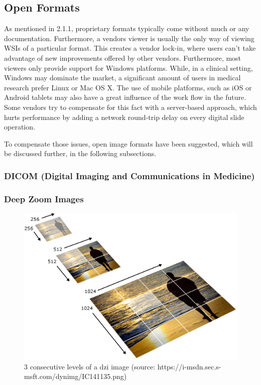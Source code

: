 \subsection{Open Formats}
As mentioned in 2.1.1, proprietary formats typically come without much or any documentation. Furthermore, a vendors viewer is usually the only way of viewing WSIs of a particular format. This creates a vendor lock-in, where users can't take advantage of new improvements offered by other vendors. Furthermore, most viewers only provide support for Windows platforms. While, in a clinical setting, Windows may dominate the market, a significant amount of users in medical research prefer Linux or Mac OS X\cite{Goode13}. The use of mobile platforms, such as iOS or Android tablets may also have a great influence of the work flow in the future. Some vendors try to compensate for this fact with a server-based approach, which hurts performance by adding a network round-trip delay on every digital slide operation\cite{Goode13}.

To compensate those issues, open image formats have been suggested, which will be discussed further, in the following subsections.


\subsubsection{DICOM (Digital Imaging and Communications in Medicine)}


\subsubsection{Deep Zoom Images}
\begin{figure}[H]
	\begin{center}
		\includegraphics[scale=0.5]{img/dzi_pyramid.png}
		\caption{3 consecutive levels of a dzi image (source: https://i-msdn.sec.s-msft.com/dynimg/IC141135.png)}
		\label{fig:fig2.1}
	\end{center}
\end{figure}

